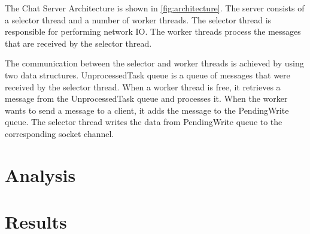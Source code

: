 \documentclass{article}
\begin{document}
The Chat Server Architecture is shown in \ref{fig:architecture}. The server consists of a selector thread and a number of worker threads.
The selector thread is responsible for performing network IO. The worker threads process the messages that are received by the selector thread.

The communication between the selector and worker threads is achieved by using two data structures. UnprocessedTask queue is a queue of messages that were received by the selector thread. When a worker thread is free, it retrieves a message from the UnprocessedTask queue and processes it.
When the worker wants to send a message to a client, it adds the message to the PendingWrite queue. The selector thread writes the data from PendingWrite queue to the corresponding socket channel.
\section{Analysis}

\section{Results}
\end{document}
